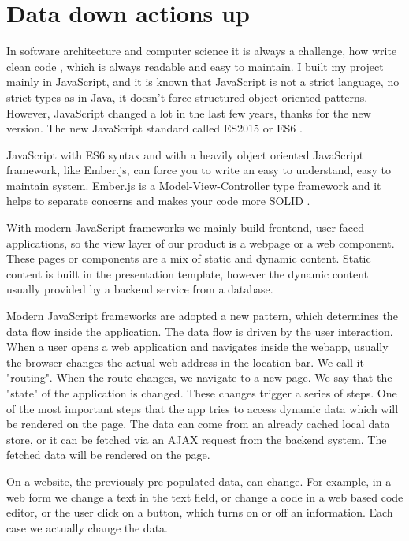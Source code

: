 \documentclass[12pt, a4paper, oneside, openright, medskipamount]{report}
\begin{document}
\section{Data down actions up}

In software architecture and computer science it is always a challenge, how write clean code \cite{clean-code}, which is always readable and easy to maintain. I built my project mainly in JavaScript, and it is known that JavaScript is not a strict language, no strict types as in Java, it doesn't force structured object oriented patterns. However, JavaScript changed a lot in the last few years, thanks for the new version. The new JavaScript standard called ES2015 or ES6 \cite{es6}.

JavaScript with ES6 syntax and with a heavily object oriented JavaScript framework, like Ember.js, can force you to write an easy to understand, easy to maintain system. Ember.js is a Model-View-Controller type framework and it helps to separate concerns and makes your code more SOLID \cite{solid}.

With modern JavaScript frameworks we mainly build frontend, user faced applications, so the view layer of our product is a webpage or a web component. These pages or components are a mix of static and dynamic content. Static content is built in the presentation template, however the dynamic content usually provided by a backend service from a database.

Modern JavaScript frameworks are adopted a new pattern, which determines the data flow inside the application. The data flow is driven by the user interaction. When a user opens a web application and navigates inside the webapp, usually the browser changes the actual web address in the location bar. We call it "routing". When the route changes, we navigate to a new page. We say that the "state" of the application is changed. These changes trigger a series of steps. One of the most important steps that the app tries to access dynamic data which will be rendered on the page. The data can come from an already cached local data store, or it can be fetched via an AJAX request from the backend system. The fetched data will be rendered on the page.

On a website, the previously pre populated data, can change. For example, in a web form we change a text in the text field, or change a code in a web based code editor, or the user click on a button, which turns on or off an information. Each case we actually change the data.
\end{document}
